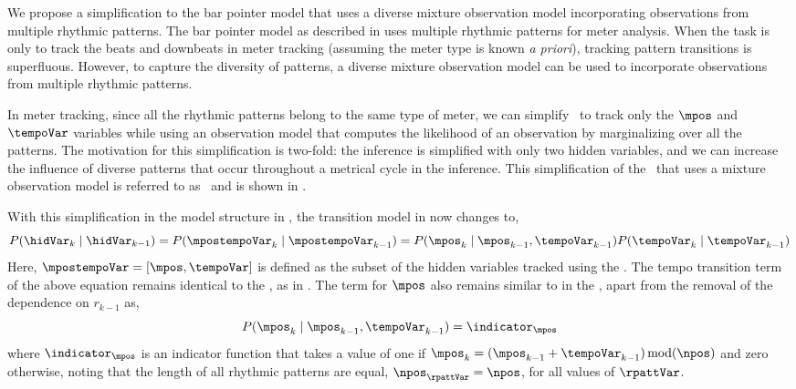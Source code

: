 We propose a simplification to the bar pointer model that uses a diverse mixture observation model incorporating observations from multiple rhythmic patterns. The bar pointer model as described in  uses multiple rhythmic patterns for meter analysis. When the task is only to track the beats and downbeats in meter tracking (assuming the meter type is known \textit{a priori}), tracking pattern transitions is superfluous. However, to capture the diversity of patterns, a diverse mixture observation model can be used to incorporate observations from multiple rhythmic patterns. 

In meter tracking, since all the rhythmic patterns belong to the same type of meter, we can simplify \bpmodel\ to track only the $\mpos$ and $\tempoVar$ variables while using an observation model that computes the likelihood of an observation by marginalizing over all the patterns. The motivation for this simplification is two-fold: the inference is simplified with only two hidden variables, and we can increase the influence of diverse patterns that occur throughout a metrical cycle in the inference. This simplification of the \bpmodel\ that uses a mixture observation model is referred to as \momodel\ and is shown in . %

With this simplification in the model structure in , the transition model in  now changes to, 
\begin{equation}\label{eqn:bpmmix:transx}
P(\hidVar_{k} \mid \hidVar_{k-1}) = P(\mpostempoVar_{k} \mid \mpostempoVar_{k-1}) = P(\mpos_{k} \mid \mpos_{k-1},\tempoVar_{k-1})P(\tempoVar_{k} \mid \tempoVar_{k-1}) 
\end{equation}
Here, $\mpostempoVar = [\mpos,\tempoVar]$ is defined as the subset of the hidden variables tracked using the \momodel. The tempo transition term of the above equation remains identical to the \bpmodel, as in . The term for $\mpos$ also remains similar to  in the \bpmodel, apart from the removal of the dependence on $r_{k-1}$ as, 
\begin{equation}\label{eqn:momodel:transmpos}
P(\mpos_{k} \mid \mpos_{k-1},\tempoVar_{k-1})=\indicator_{\mpos}
\end{equation}
where $\indicator_{\mpos}$ is an indicator function that takes a value of one if $\mpos_{k} = (\mpos_{k-1} + \tempoVar_{k-1})\!\!\!\mod\!\!(\npos)$ and zero otherwise, noting that the length of all rhythmic patterns are equal, $\npos_\rpattVar = \npos$, for all values of $\rpattVar$. 

